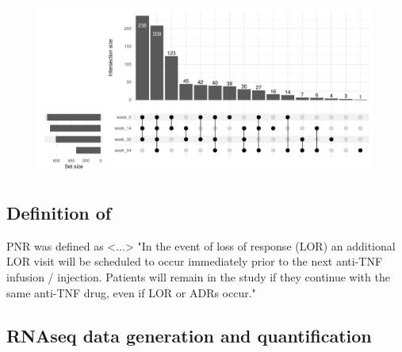 \begin{outline}
\begin{figure}
    \centering
    \includegraphics[width=1.0\textwidth,page=1]{mainmatter/figures/chapter_05/process_pheno.pheno_filtered_dge.Visit_Label_upset.pdf}
    \caption{}
    \label{fig:multipants_visits_upset}
\end{figure}

\subsection{Definition of }

%
\1 \gls{PNR} was defined as <...>
\1 "In the event of loss of response (LOR) an additional LOR visit will be scheduled to occur immediately prior to the next anti-TNF infusion / injection.  Patients will remain in the study if they continue with the same anti-TNF drug, even if LOR or ADRs occur."

\subsection{RNAseq data generation and quantification}


\end{outline}
